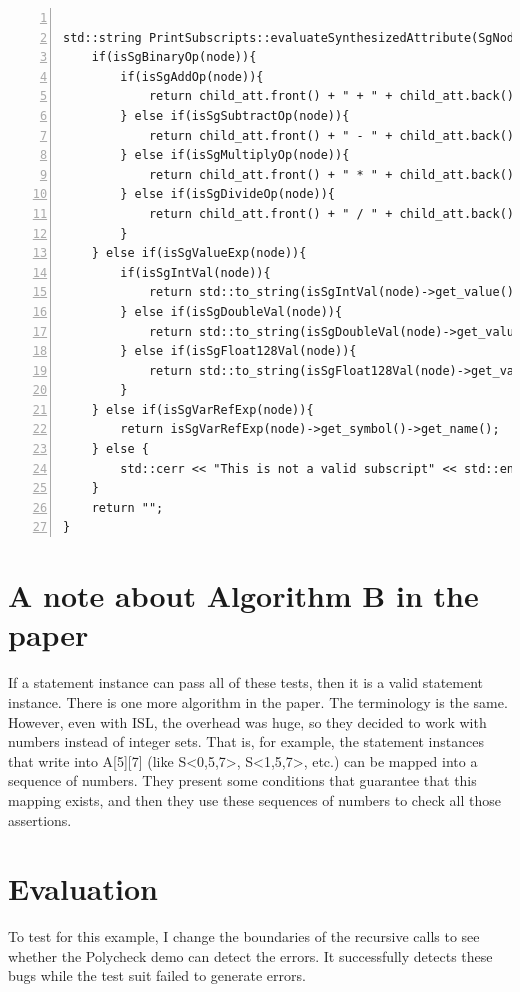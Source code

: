 \documentclass[letterpaper,12pt]{article}
\begin{document}
\begin{lstlisting}[caption={Buttom up traversal - Based on the type of the node we will retrieving its string and pass it to its parent.}, label={code:printing}, numbers=left, captionpos=b, stepnumber=1]

std::string PrintSubscripts::evaluateSynthesizedAttribute(SgNode* node, SynthesizedAttributesList child_att){
	if(isSgBinaryOp(node)){
		if(isSgAddOp(node)){
			return child_att.front() + " + " + child_att.back();
		} else if(isSgSubtractOp(node)){
			return child_att.front() + " - " + child_att.back();
		} else if(isSgMultiplyOp(node)){
			return child_att.front() + " * " + child_att.back();
		} else if(isSgDivideOp(node)){
			return child_att.front() + " / " + child_att.back();
		}
	} else if(isSgValueExp(node)){
		if(isSgIntVal(node)){
			return std::to_string(isSgIntVal(node)->get_value());
		} else if(isSgDoubleVal(node)){
			return std::to_string(isSgDoubleVal(node)->get_value());
		} else if(isSgFloat128Val(node)){
			return std::to_string(isSgFloat128Val(node)->get_value());
		}
	} else if(isSgVarRefExp(node)){
		return isSgVarRefExp(node)->get_symbol()->get_name();
	} else {
		std::cerr << "This is not a valid subscript" << std::endl;
	}
	return "";
}

\end{lstlisting}


 
\section{A note about Algorithm B in the paper}

	If a statement instance can pass all of these tests, then it is a valid statement instance. There is one more algorithm in the paper. The terminology is the same. However, even with ISL, the overhead was huge, so they decided to work with numbers instead of integer sets. That is, for example, the statement instances that write into A[5][7] (like S<0,5,7>, S<1,5,7>, etc.) can be mapped into a sequence of numbers. They present some conditions that guarantee that this mapping exists, and then they use these sequences of numbers to check all those assertions.
	
	\section{Evaluation}
	
To test for this example, I change the boundaries of the recursive calls to see whether the Polycheck demo can detect the errors. It successfully detects these bugs while the test suit failed to generate errors. 
\end{document}
